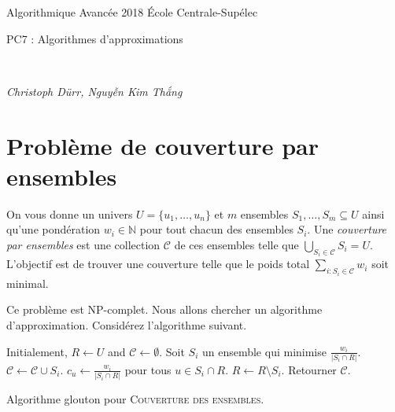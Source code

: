 \documentclass[12pt]{article}
\newcommand{\MakeScribeTop}[1]{
\noindent
\begin{framed}
\noindent
 Algorithmique Avancée 2018
 \hfill
 École Centrale-Supélec
 \\[1em]
 \centerline{ \Large
#1
 }
 \\[1em]
\centerline{  \it Christoph Dürr, Nguyễn Kim Thắng}
\end{framed}
}
\begin{document}
    \MakeScribeTop{PC7 : Algorithmes d'approximations}



\section{Problème de couverture par ensembles}

\begin{figwindow}
On vous donne un univers $U = \{u_{1}, \ldots, u_{n}\}$ et $m$ ensembles 
$S_{1}, \ldots, S_{m}\subseteq U$ ainsi qu'une pondération $w_{i}\in \mathbb N$ pour tout chacun des ensembles $S_i$.
Une \emph{couverture par ensembles} est une collection $\mathcal{C}$ de
ces ensembles telle que $\bigcup_{S_{i} \in \mathcal{C}} S_{i} = U$. 
L'objectif est de trouver une couverture telle que le poids total 
$\sum_{i:S_{i} \in \mathcal{C}} w_{i}$ soit minimal.	

Ce problème est NP-complet. Nous allons chercher un algorithme d'approximation.
Considérez l'algorithme suivant.
\end{figwindow}

\vspace{1cm}


\begin{algorithm}[ht]
\begin{algorithmic}[1]  
\STATE Initialement, $R \gets U$ and $\mathcal{C} \gets \emptyset$. 
	\STATE Soit $S_{i}$ un ensemble qui minimise $\frac{w_{i}}{|S_{i} \cap R|}$.
	\STATE $\mathcal{C} \gets \mathcal{C} \cup S_{i}$.
	\STATE $c_{u} \gets \frac{w_{i}}{|S_{i} \cap R|}$ pour tous $u \in S_{i} \cap R$. 
	\STATE $R \gets R \setminus S_{i}$.
\ENDWHILE
\STATE Retourner $\mathcal{C}$.
\end{algorithmic}
\caption{Algorithme glouton pour \textsc{Couverture des ensembles}.}
\label{algo:covering}
\end{algorithm}
\end{document}
